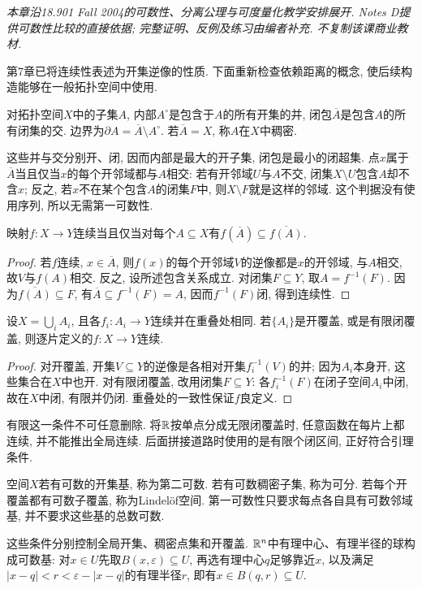 \label{ch:separation}
\emph{本章沿18.901 Fall 2004的可数性、分离公理与可度量化教学安排展开. Notes D提供可数性比较的直接依据; 完整证明、反例及练习由编者补充. 不复制该课商业教材.}

第7章已将连续性表述为开集逆像的性质. 下面重新检查依赖距离的概念, 使后续构造能够在一般拓扑空间中使用.
\begin{definition}
对拓扑空间$X$中的子集$A$, 内部$A^\circ$是包含于$A$的所有开集的并, 闭包$\overline A$是包含$A$的所有闭集的交. 边界为$\partial A=\overline A\setminus A^\circ$. 若$\overline A=X$, 称$A$在$X$中稠密.
\end{definition}
这些并与交分别开、闭, 因而内部是最大的开子集, 闭包是最小的闭超集. 点$x$属于$\overline A$当且仅当$x$的每个开邻域都与$A$相交: 若有开邻域$U$与$A$不交, 闭集$X\setminus U$包含$A$却不含$x$; 反之, 若$x$不在某个包含$A$的闭集$F$中, 则$X\setminus F$就是这样的邻域. 这个判据没有使用序列, 所以无需第一可数性.

\begin{proposition}\label{thm:closure-continuity}
映射$f:X\to Y$连续当且仅当对每个$A\subseteq X$有$f(\overline A)\subseteq\overline{f(A)}$.
\end{proposition}
\begin{proof}
若$f$连续, $x\in\overline A$, 则$f(x)$的每个开邻域$V$的逆像都是$x$的开邻域, 与$A$相交, 故$V$与$f(A)$相交. 反之, 设所述包含关系成立. 对闭集$F\subseteq Y$, 取$A=f^{-1}(F)$. 因为$\overline{f(A)}\subseteq F$, 有$\overline A\subseteq f^{-1}(F)=A$, 因而$f^{-1}(F)$闭, 得到连续性.
\end{proof}

\begin{lemma}[粘合引理]\label{lem:pasting}
设$X=\bigcup_i A_i$, 且各$f_i:A_i\to Y$连续并在重叠处相同. 若$\{A_i\}$是开覆盖, 或是有限闭覆盖, 则逐片定义的$f:X\to Y$连续.
\end{lemma}
\begin{proof}
对开覆盖, 开集$V\subseteq Y$的逆像是各相对开集$f_i^{-1}(V)$的并; 因为$A_i$本身开, 这些集合在$X$中也开. 对有限闭覆盖, 改用闭集$F\subseteq Y$: 各$f_i^{-1}(F)$在闭子空间$A_i$中闭, 故在$X$中闭, 有限并仍闭. 重叠处的一致性保证$f$良定义.
\end{proof}
有限这一条件不可任意删除. 将$\mathbb R$按单点分成无限闭覆盖时, 任意函数在每片上都连续, 并不能推出全局连续. 后面拼接道路时使用的是有限个闭区间, 正好符合引理条件.

\begin{definition}
空间$X$若有可数的开集基, 称为第二可数. 若有可数稠密子集, 称为可分. 若每个开覆盖都有可数子覆盖, 称为Lindel\"of空间. 第一可数性只要求每点各自具有可数邻域基, 并不要求这些基的总数可数.
\end{definition}
这些条件分别控制全局开集、稠密点集和开覆盖. $\mathbb R^n$中有理中心、有理半径的球构成可数基: 对$x\in U$先取$B(x,\varepsilon)\subseteq U$, 再选有理中心$q$足够靠近$x$, 以及满足$|x-q|<r<\varepsilon-|x-q|$的有理半径$r$, 即有$x\in B(q,r)\subseteq U$.

